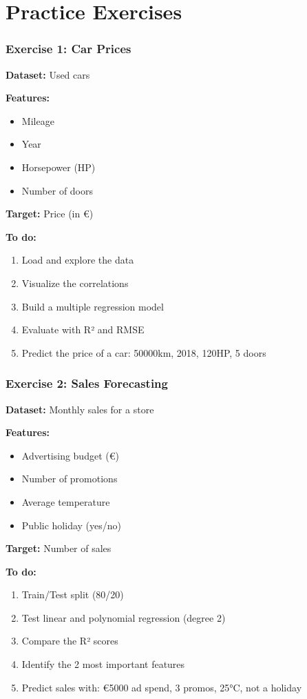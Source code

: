 \documentclass{beamer}
\begin{document}
\section{Practice Exercises}

\begin{frame}
\frametitle{Exercise 1: Car Prices}
\textbf{Dataset:} Used cars

\vspace{0.5em}
\textbf{Features:}
\begin{itemize}
    \item Mileage
    \item Year
    \item Horsepower (HP)
    \item Number of doors
\end{itemize}

\vspace{0.5em}
\textbf{Target:} Price (in €)

\vspace{1em}
\textbf{To do:}
\begin{enumerate}
    \item Load and explore the data
    \item Visualize the correlations
    \item Build a multiple regression model
    \item Evaluate with R² and RMSE
    \item Predict the price of a car: 50000km, 2018, 120HP, 5 doors
\end{enumerate}
\end{frame}

\begin{frame}
\frametitle{Exercise 2: Sales Forecasting}
\textbf{Dataset:} Monthly sales for a store

\vspace{0.5em}
\textbf{Features:}
\begin{itemize}
    \item Advertising budget (€)
    \item Number of promotions
    \item Average temperature
    \item Public holiday (yes/no)
\end{itemize}

\vspace{0.5em}
\textbf{Target:} Number of sales

\vspace{1em}
\textbf{To do:}
\begin{enumerate}
    \item Train/Test split (80/20)
    \item Test linear and polynomial regression (degree 2)
    \item Compare the R² scores
    \item Identify the 2 most important features
    \item Predict sales with: €5000 ad spend, 3 promos, 25°C, not a holiday
\end{enumerate}
\end{frame}
\end{document}
